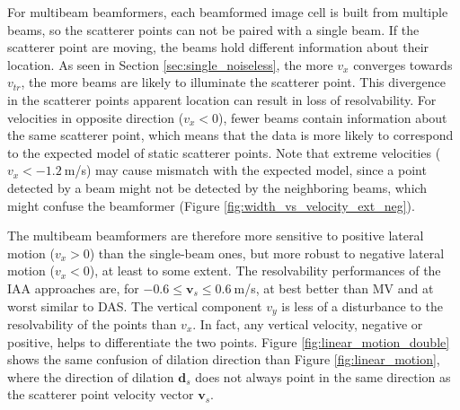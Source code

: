 For multibeam beamformers, each beamformed image cell is built from multiple beams, so the scatterer points can not be paired with a single beam. 
If the scatterer point are moving, the beams hold different information about their location. As seen in Section \ref{sec:single_noiseless}, the more $v_x$ converges towards $v_{tr}$, the more beams are likely to illuminate the scatterer point. This divergence in the scatterer points apparent location can result in loss of resolvability.
For velocities in opposite direction ($v_x < 0$), fewer beams contain information about the same scatterer point, which means that the data is more likely to correspond to the expected model of static scatterer points.
Note that extreme velocities ($v_x < -1.2~$m/s) may cause mismatch with the expected model, since a point detected by a beam might not be detected by the neighboring beams, which might confuse the beamformer (Figure \ref{fig:width_vs_velocity_ext_neg}).

The multibeam beamformers are therefore more sensitive to positive lateral motion ($v_x > 0$) than the single-beam ones, but more robust to negative lateral motion ($v_x < 0$), at least to some extent.
The resolvability performances of the IAA approaches are, for $-0.6 \leq \boldsymbol{v}_s \leq 0.6~$m/s, at best better than MV and at worst similar to DAS.
The vertical component $v_y$ is less of a disturbance to the resolvability of the points than $v_x$. In fact, any vertical velocity, negative or positive, helps to differentiate the two points.
Figure \ref{fig:linear_motion_double} shows the same confusion of dilation direction than Figure \ref{fig:linear_motion}, where the direction of dilation $\boldsymbol{d}_s$ does not always point in the same direction as the scatterer point velocity vector $\boldsymbol{v}_s$.

